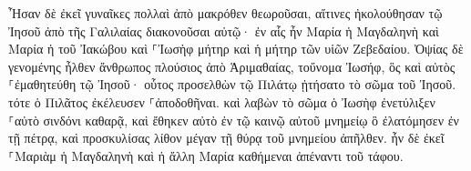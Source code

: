 \documentclass{openreader}
\begin{document}
Ἦσαν δὲ ἐκεῖ γυναῖκες πολλαὶ ἀπὸ μακρόθεν θεωροῦσαι, αἵτινες ἠκολούθησαν τῷ Ἰησοῦ ἀπὸ τῆς Γαλιλαίας διακονοῦσαι αὐτῷ· 
ἐν αἷς ἦν Μαρία ἡ Μαγδαληνὴ καὶ Μαρία ἡ τοῦ Ἰακώβου καὶ ⸀Ἰωσὴφ μήτηρ καὶ ἡ μήτηρ τῶν υἱῶν Ζεβεδαίου. 
Ὀψίας δὲ γενομένης ἦλθεν ἄνθρωπος πλούσιος ἀπὸ Ἁριμαθαίας, τοὔνομα Ἰωσήφ, ὃς καὶ αὐτὸς ⸀ἐμαθητεύθη τῷ Ἰησοῦ· 
οὗτος προσελθὼν τῷ Πιλάτῳ ᾐτήσατο τὸ σῶμα τοῦ Ἰησοῦ. τότε ὁ Πιλᾶτος ἐκέλευσεν ⸀ἀποδοθῆναι. 
καὶ λαβὼν τὸ σῶμα ὁ Ἰωσὴφ ἐνετύλιξεν ⸀αὐτὸ σινδόνι καθαρᾷ, 
καὶ ἔθηκεν αὐτὸ ἐν τῷ καινῷ αὐτοῦ μνημείῳ ὃ ἐλατόμησεν ἐν τῇ πέτρᾳ, καὶ προσκυλίσας λίθον μέγαν τῇ θύρᾳ τοῦ μνημείου ἀπῆλθεν. 
ἦν δὲ ἐκεῖ ⸀Μαριὰμ ἡ Μαγδαληνὴ καὶ ἡ ἄλλη Μαρία καθήμεναι ἀπέναντι τοῦ τάφου. 
\end{document}
